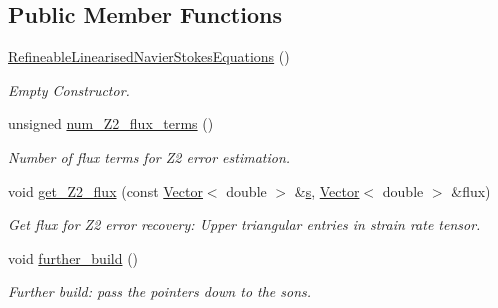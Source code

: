 \subsection*{Public Member Functions}
\begin{DoxyCompactItemize}
\item 
\hyperlink{classoomph_1_1RefineableLinearisedNavierStokesEquations_aff7f2c3b664951a440739d813460ee76}{Refineable\+Linearised\+Navier\+Stokes\+Equations} ()
\begin{DoxyCompactList}\small\item\em Empty Constructor. \end{DoxyCompactList}\item 
unsigned \hyperlink{classoomph_1_1RefineableLinearisedNavierStokesEquations_a54024569bb3ee36f0679c8bbfa2673a6}{num\+\_\+\+Z2\+\_\+flux\+\_\+terms} ()
\begin{DoxyCompactList}\small\item\em Number of \textquotesingle{}flux\textquotesingle{} terms for Z2 error estimation. \end{DoxyCompactList}\item 
void \hyperlink{classoomph_1_1RefineableLinearisedNavierStokesEquations_adc7caa7e2d2f103bc4dc9f9ed83943f4}{get\+\_\+\+Z2\+\_\+flux} (const \hyperlink{classoomph_1_1Vector}{Vector}$<$ double $>$ \&\hyperlink{cfortran_8h_ab7123126e4885ef647dd9c6e3807a21c}{s}, \hyperlink{classoomph_1_1Vector}{Vector}$<$ double $>$ \&flux)
\begin{DoxyCompactList}\small\item\em Get \textquotesingle{}flux\textquotesingle{} for Z2 error recovery\+: Upper triangular entries in strain rate tensor. \end{DoxyCompactList}\item 
void \hyperlink{classoomph_1_1RefineableLinearisedNavierStokesEquations_a4a160cd28d0a5a865884fd9f27254a2d}{further\+\_\+build} ()
\begin{DoxyCompactList}\small\item\em Further build\+: pass the pointers down to the sons. \end{DoxyCompactList}\end{DoxyCompactItemize}
